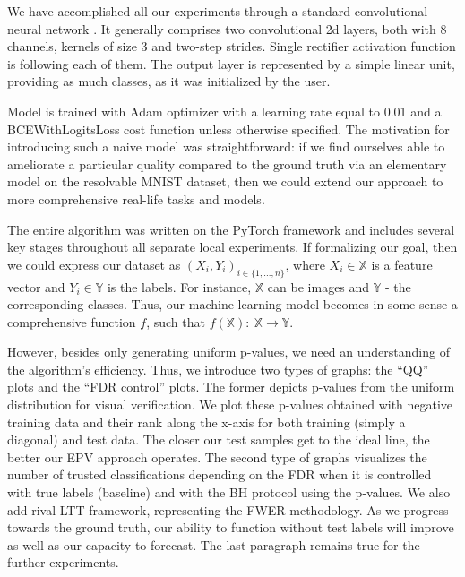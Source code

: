 \documentclass{article}
\begin{document}
We have accomplished all our experiments through a standard convolutional neural network \cite{cnn}. It generally comprises two convolutional 2d layers, both with 8 channels, kernels of size 3 and two-step strides. Single rectifier activation function is following each of them.  The output layer is represented by a simple linear unit, providing as much classes, as it was initialized by the user.   

Model is trained with Adam optimizer with a learning rate equal to 0.01 and a BCEWithLogitsLoss cost function unless otherwise specified. The motivation for introducing such a naive model was straightforward: if we find ourselves able to ameliorate a particular quality compared to the ground truth via an elementary model on the resolvable MNIST dataset, then we could extend our approach to more comprehensive real-life tasks and models.

The entire algorithm was written on the PyTorch framework and includes several key stages throughout all separate local experiments. If formalizing our goal, then we could express our dataset as $(X_i, Y_i)_{i\in\{1, ..., n\}}$, where $X_i \in \mathbb{X}$ is a feature vector and  $Y_i \in \mathbb{Y}$ is the labels. For instance, $\mathbb{X}$ can be images and $\mathbb{Y}$ - the corresponding classes. Thus, our machine learning model becomes in some sense a comprehensive function $f$, such that $f(\mathbb{X}): \  \mathbb{X} \rightarrow \mathbb{Y}$.

However, besides only generating uniform p-values, we need an understanding of the algorithm’s efficiency. Thus, we introduce two types of graphs: the “QQ” plots and the “FDR control” plots. The former depicts p-values from the uniform distribution for visual verification. We plot these p-values obtained with negative training data and their rank along the x-axis for both training (simply a diagonal) and test data. The closer our test samples get to the ideal line, the better our EPV approach operates. The second type of graphs visualizes the number of trusted classifications depending on the FDR when it is controlled with true labels (baseline) and with the BH protocol using the p-values. We also add rival LTT framework, representing the FWER methodology. As we progress towards the ground truth, our ability to function without test labels will improve as well as our capacity to forecast. The last paragraph remains true for the further experiments.
\end{document}
